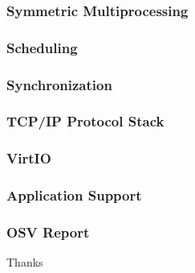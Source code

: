 \documentclass[10pt]{beamer}
\begin{document}
\begin{frame}
	\frametitle{Symmetric Multiprocessing}
  
	
\end{frame}



\begin{frame}
	\frametitle{Scheduling}


\end{frame}



\begin{frame}
	\frametitle{Synchronization}

\end{frame}


\begin{frame}
	\frametitle{TCP/IP Protocol Stack}

\end{frame}

\begin{frame}
	\frametitle{VirtIO}

\end{frame}


\begin{frame}
	\frametitle{Application Support}
	

\end{frame}



\begin{frame}
	\frametitle{OSV Report}

\center
Thanks

\end{frame}
\end{document}
